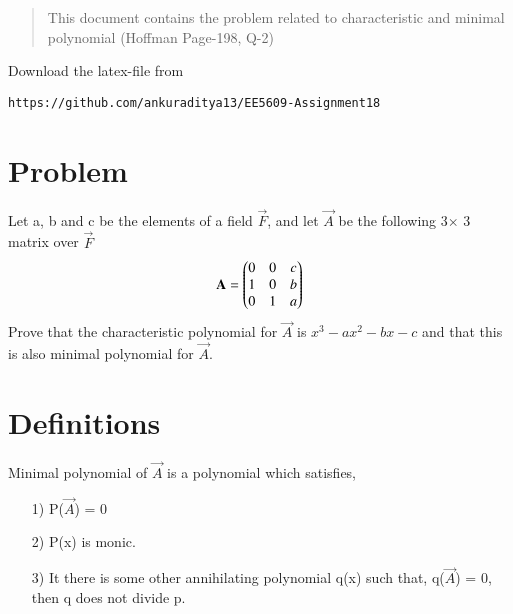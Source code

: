\documentclass[journal,12pt,twocolumn]{IEEEtran}
\begin{document}
\begin{abstract}
This document contains the problem related to characteristic and minimal polynomial (Hoffman Page-198, Q-2) 
\end{abstract}
Download the latex-file from 
\begin{lstlisting}
https://github.com/ankuraditya13/EE5609-Assignment18
\end{lstlisting}

\section{Problem}
Let a, b and c be the elements of a field $\vec{F}$, and let $\vec{A}$ be the following 3$\times$ 3 matrix over $\vec{F}$
\begin{align}
\mathbf{A} = \begin{pmatrix}0&0&c\\1&0&b\\0&1&a\end{pmatrix}
\label{Q}
\end{align}
Prove that the characteristic polynomial for $\vec{A}$ is $x^3-ax^2-bx-c$ and that this is also minimal polynomial for $\vec{A}$.
\section{\textbf{Definitions}}
Minimal polynomial of $\vec{A}$ is a polynomial which satisfies,
\begin{enumerate}
\item[1)] P($\vec{A}$) = 0
\item[2)] P(x) is monic.
\item[3)] It there is some other annihilating polynomial q(x) such that, q($\vec{A}$) = 0, then q does not divide p. 
\end{enumerate}
\end{document}
